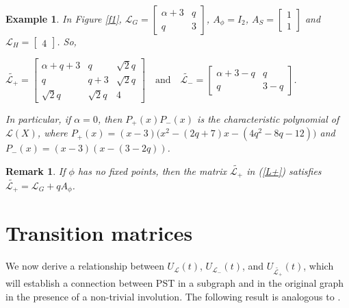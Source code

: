 \documentclass[12pt,a4paper]{article}
\newtheorem{exm}{Example}
\newtheorem{rem}{Remark}
\begin{document}
\begin{exm}
In Figure \ref{f1}, $\mathscr{L}_G=\begin{bmatrix}
		\alpha+3&q\\
		q & 3
\end{bmatrix}$, $A_\phi=I_2$, $A_S=\begin{bmatrix}
		1\\
		1
\end{bmatrix}$ and $\mathscr{L}_H=\begin{bmatrix}4\end{bmatrix}$. So,
\begin{center}
$\widetilde{\mathscr{L}_+}=\begin{bmatrix}
		\alpha+q+3&q&\sqrt{2}q\\q&q+3&\sqrt{2}q\\
		\sqrt{2}q& \sqrt{2}q&4
\end{bmatrix}\quad\text{and}\quad \widetilde{\mathscr{L}_-}=\begin{bmatrix}
		\alpha+3-q&q\\
		q& 3-q
\end{bmatrix}$.
\end{center}
In particular, if $\alpha=0$, then $P_+(x)P_-(x)$ is the characteristic polynomial of $\mathscr{L}(X)$, where $P_+(x)=(x-3)\big(x^2-(2q+7)x-(4q^2-8q-12)\big)$ and $P_-(x)=(x-3)(x-(3-2q))$. 
\end{exm}

\begin{rem}
\label{rem1}
If $\phi$ has no fixed points, then the matrix $\widetilde{\mathscr{L}_+}$ in (\ref{L+}) satisfies $\widetilde{\mathscr{L}_+}=\mathscr{L}_G+qA_\phi$.
\end{rem}

\section{Transition matrices}\label{sec21}

We now derive a relationship between $U_\mathscr{L}(t)$, $U_{\mathscr{L}_{-}}(t)$, and $U_{\widetilde{\mathscr{L}_+}}(t)$, which will establish a connection between PST in a subgraph and in the original graph in the presence of a non-trivial involution. The following result is analogous to \cite[Lemma 4]{pal7}.
 
\end{document}
